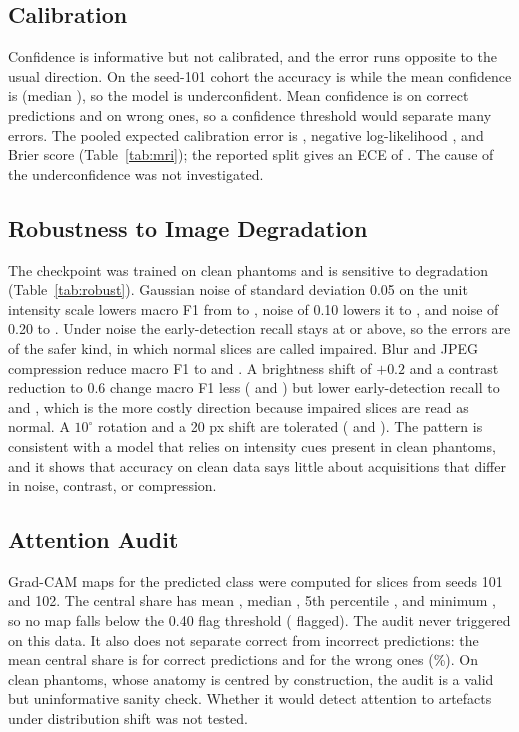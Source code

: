 \documentclass[conference]{IEEEtran}
\begin{document}


\subsection{Calibration}
Confidence is informative but not calibrated, and the error runs opposite to the usual direction. On the seed-101 cohort the accuracy is \ConfAcc{} while the mean confidence is \ConfMean{} (median \ConfMedian{}), so the model is underconfident. Mean confidence is \ConfCorrect{} on correct predictions and \ConfWrong{} on wrong ones, so a confidence threshold would separate many errors. The pooled expected calibration error is \PoolEce{}, negative log-likelihood \PoolNll{}, and Brier score \PoolBrier{} (Table~\ref{tab:mri}); the reported split gives an ECE of \EOneEce{}. The cause of the underconfidence was not investigated.

\subsection{Robustness to Image Degradation}
The checkpoint was trained on clean phantoms and is sensitive to degradation (Table~\ref{tab:robust}). Gaussian noise of standard deviation 0.05 on the unit intensity scale lowers macro F1 from \RobCleanF{} to \RobNoiseFiveF{}, noise of 0.10 lowers it to \RobNoiseTenF{}, and noise of 0.20 to \RobNoiseTwentyF{}. Under noise the early-detection recall stays at \RobNoiseTwentyE{} or above, so the errors are of the safer kind, in which normal slices are called impaired. Blur and JPEG compression reduce macro F1 to \RobBlurF{} and \RobJpegF{}. A brightness shift of $+0.2$ and a contrast reduction to 0.6 change macro F1 less (\RobBrightF{} and \RobContrastF{}) but lower early-detection recall to \RobBrightE{} and \RobContrastE{}, which is the more costly direction because impaired slices are read as normal. A $10^\circ$ rotation and a 20 px shift are tolerated (\RobRotateF{} and \RobShiftF{}). The pattern is consistent with a model that relies on intensity cues present in clean phantoms, and it shows that accuracy on clean data says little about acquisitions that differ in noise, contrast, or compression.



\subsection{Attention Audit}
Grad-CAM maps for the predicted class were computed for \GcN{} slices from seeds 101 and 102. The central share has mean \GcMean{}, median \GcMedian{}, 5th percentile \GcPfive{}, and minimum \GcMin{}, so no map falls below the 0.40 flag threshold (\GcFlag{} flagged). The audit never triggered on this data. It also does not separate correct from incorrect predictions: the mean central share is \GcCorrect{} for correct predictions and \GcWrongMean{} for the \GcNWrong{} wrong ones (\GcNWrongPct\%). On clean phantoms, whose anatomy is centred by construction, the audit is a valid but uninformative sanity check. Whether it would detect attention to artefacts under distribution shift was not tested.
\end{document}

